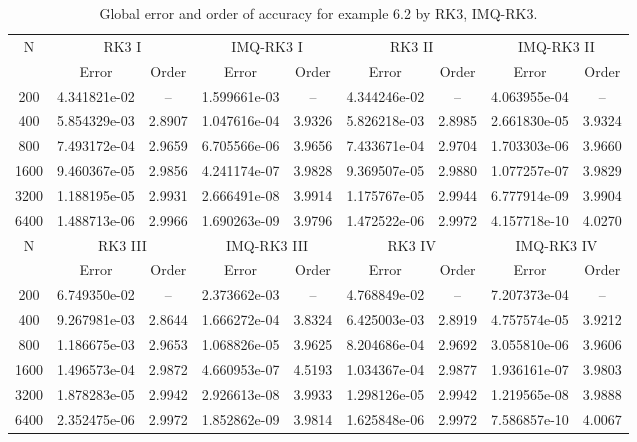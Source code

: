 \documentclass[a4paper, preprint,11pt]{elsarticle}
\numberwithin{equation}{section}
\begin{document}
\begin{table}[htbp!]
    \centering
     \caption{Global error and order of accuracy for example 6.2 by RK3, IMQ-RK3.}
    \begin{tabular}{c c c c c c c c c}
        \toprule
        N & \multicolumn{2}{c}{RK3 I} & \multicolumn{2}{c}{IMQ-RK3 I} & \multicolumn{2}{c}{RK3 II} & \multicolumn{2}{c}{IMQ-RK3 II}\\
        \cmidrule(lr){2-3} \cmidrule(lr){4-5} \cmidrule(lr){6-7} \cmidrule(lr){8-9}
          & Error & Order & Error & Order & Error & Order & Error & Order\\
        \midrule
        200 & 4.341821e-02   &--   & 1.599661e-03 & -- & 4.344246e-02    & --& 4.063955e-04  & --  \\
        400 &  5.854329e-03   & 2.8907   & 1.047616e-04 & 3.9326 &  5.826218e-03   &  2.8985& 2.661830e-05 &  3.9324\\
        800 &  7.493172e-04   &  2.9659   & 6.705566e-06 & 3.9656 & 7.433671e-04 & 2.9704 & 1.703303e-06 & 3.9660 \\
       1600 &  9.460367e-05    & 2.9856  & 4.241174e-07 & 3.9828 & 9.369507e-05 & 2.9880&  1.077257e-07   & 3.9829\\
       3200 &  1.188195e-05  &  2.9931  & 2.666491e-08 &  3.9914 & 1.175767e-05  & 2.9944&6.777914e-09  &  3.9904 \\
       6400 &  1.488713e-06    & 2.9966  &  1.690263e-09 & 3.9796 & 1.472522e-06  &  2.9972& 4.157718e-10  & 4.0270 \\
       \midrule
        N & \multicolumn{2}{c}{RK3 III} & \multicolumn{2}{c}{IMQ-RK3 III} & \multicolumn{2}{c}{RK3 IV} & \multicolumn{2}{c}{IMQ-RK3 IV}\\
        \cmidrule(lr){2-3} \cmidrule(lr){4-5} \cmidrule(lr){6-7} \cmidrule(lr){8-9}
          & Error & Order & Error & Order & Error & Order  & Error & Order \\
        \midrule
200 & 6.749350e-02 &-- &  2.373662e-03  & -- & 4.768849e-02   &-- & 7.207373e-04  &--\\
400 & 9.267981e-03 &   2.8644  &   1.666272e-04 & 3.8324 &6.425003e-03  & 2.8919 & 4.757574e-05 & 3.9212 \\
800 & 1.186675e-03  &  2.9653  &  1.068826e-05  &  3.9625 &8.204686e-04 & 2.9692 &3.055810e-06  & 3.9606   \\
1600 &1.496573e-04    &  2.9872   &  4.660953e-07 & 4.5193 &1.034367e-04 & 2.9877 & 1.936161e-07  & 3.9803   \\
3200 &  1.878283e-05  &  2.9942   & 2.926613e-08 & 3.9933 &1.298126e-05 & 2.9942& 1.219565e-08   &  3.9888   \\
6400 & 2.352475e-06  &  2.9972  & 1.852862e-09  & 3.9814 & 1.625848e-06 &  2.9972& 7.586857e-10  &   4.0067    \\
\bottomrule
    \end{tabular}
\end{table}
\end{document}
